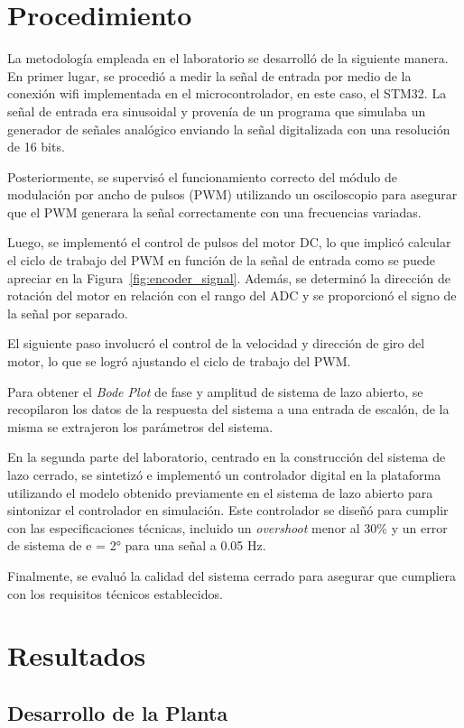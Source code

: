 \documentclass[conference,onecolumn]{IEEEtran}
\begin{document}
\section{Procedimiento}
La metodología empleada en el laboratorio se desarrolló de la siguiente manera. En primer lugar, se procedió a medir la señal de entrada por medio de la conexión wifi implementada en el microcontrolador, en este caso, el STM32. La señal de entrada era sinusoidal y provenía de un programa que simulaba un generador de señales analógico enviando la señal digitalizada con una resolución de 16 bits.

Posteriormente, se supervisó el funcionamiento correcto del módulo de modulación por ancho de pulsos (PWM) utilizando un osciloscopio para asegurar que el PWM generara la señal correctamente con una frecuencias variadas.

Luego, se implementó el control de pulsos del motor DC, lo que implicó calcular el ciclo de trabajo del PWM en función de la señal de entrada como se puede apreciar en la Figura~\ref{fig:encoder_signal}. Además, se determinó la dirección de rotación del motor en relación con el rango del ADC y se proporcionó el signo de la señal por separado.

El siguiente paso involucró el control de la velocidad y dirección de giro del motor, lo que se logró ajustando el ciclo de trabajo del PWM.

Para obtener el \textit{Bode Plot} de fase y amplitud de sistema de lazo abierto, se recopilaron los datos de la respuesta del sistema a una entrada de escalón, de la misma se extrajeron los parámetros del sistema.

En la segunda parte del laboratorio, centrado en la construcción del sistema de lazo cerrado, se sintetizó e implementó un controlador digital en la plataforma utilizando el modelo obtenido previamente en el sistema de lazo abierto para sintonizar el controlador en simulación. Este controlador se diseñó para cumplir con las especificaciones técnicas, incluido un \textit{overshoot} menor al 30\% y un error de sistema de e = 2° para una señal a 0.05 Hz.

Finalmente, se evaluó la calidad del sistema cerrado para asegurar que cumpliera con los requisitos técnicos establecidos.

\section{Resultados}

\subsection{Desarrollo de la Planta}
\end{document}
